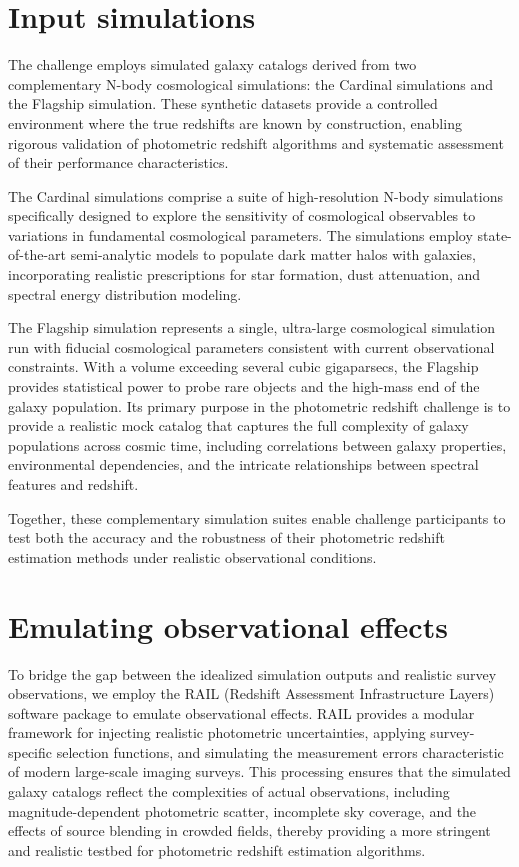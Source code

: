 \documentclass[11pt,twoside,letterpaper,onecolumn,english]{article}
\begin{document}
\appendix


\section{Input simulations}
\label{sec:input_sims}

The challenge employs simulated galaxy catalogs derived from two
complementary N-body cosmological simulations: the Cardinal
simulations and the Flagship simulation. These synthetic datasets
provide a controlled environment where the true redshifts are known by
construction, enabling rigorous validation of photometric redshift
algorithms and systematic assessment of their performance
characteristics.

The Cardinal simulations comprise a suite of high-resolution N-body
simulations specifically designed to explore the sensitivity of
cosmological observables to variations in fundamental cosmological
parameters. The simulations employ state-of-the-art semi-analytic
models to populate dark matter halos with galaxies, incorporating
realistic prescriptions for star formation, dust attenuation, and
spectral energy distribution modeling.

The Flagship simulation represents a single, ultra-large cosmological
simulation run with fiducial cosmological parameters consistent with
current observational constraints. With a volume exceeding several
cubic gigaparsecs, the Flagship provides statistical power to probe
rare objects and the high-mass end of the galaxy population. Its
primary purpose in the photometric redshift challenge is to provide a
realistic mock catalog that captures the full complexity of galaxy
populations across cosmic time, including correlations between galaxy
properties, environmental dependencies, and the intricate
relationships between spectral features and redshift.

Together, these complementary simulation suites enable challenge
participants to test both the accuracy and the robustness of their
photometric redshift estimation methods under realistic observational
conditions.


\section{Emulating observational effects}
\label{sec:emulating_observations}

To bridge the gap between the idealized simulation outputs and
realistic survey observations, we employ the RAIL (Redshift Assessment
Infrastructure Layers) software package to emulate observational
effects. RAIL provides a modular framework for injecting realistic
photometric uncertainties, applying survey-specific selection
functions, and simulating the measurement errors characteristic of
modern large-scale imaging surveys. This processing ensures that the
simulated galaxy catalogs reflect the complexities of actual
observations, including magnitude-dependent photometric scatter,
incomplete sky coverage, and the effects of source blending in crowded
fields, thereby providing a more stringent and realistic testbed for
photometric redshift estimation algorithms.
\end{document}
